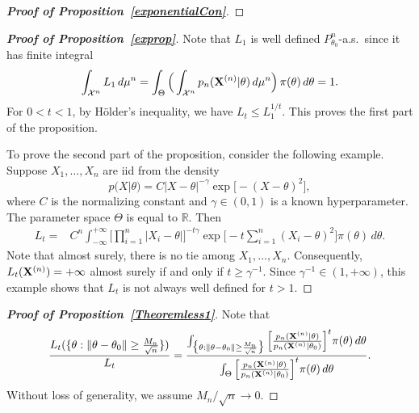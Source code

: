 \documentclass[11pt]{article}
\theoremstyle{plain}
\theoremstyle{definition}
\theoremstyle{remark}
\begin{document}
\begin{appendices}
\begin{proof}[\textbf{Proof of Proposition~\ref{exponentialCon}}]
\end{proof}

\begin{proof}[\textbf{Proof of Proposition~\ref{exprop}}]

Note that $L_1$ is well defined $P_{\theta_0}^n$-a.s.\ since it has finite integral
$$
\int_{\mathcal{X}^n} L_1 \, d\mu^n=
\int_{\Theta}\Big(\int_{\mathcal{X}^n} p_n(\mathbf{X}^{(n)}|\theta) \, d\mu^n \Big) \, \pi(\theta)\, d\theta=1.
$$
For $0<t<1$, by H\"older's inequality, we have $L_{t}\leq L_1^{1/t}$. This proves the first part of the proposition. 

To prove the second part of the proposition, consider the following example.
Suppose $X_1,\ldots,X_n$ are iid from the density
$$
    p(X|\theta)=C |X-\theta|^{-\gamma}\exp\big[-(X-\theta)^2\big]
,
$$
where $C$ is the normalizing constant and $\gamma\in(0,1)$ is a known hyperparameter. The parameter space $\Theta$ is equal to $\mathbb{R}$.
Then
$$
    \begin{aligned}
        L_t=&
    C^n \int_{-\infty}^{+\infty}
\Big[\prod_{i=1}^n |X_i-\theta|\Big]^{-t\gamma}
    \exp \big[-t\sum_{i=1}^n (X_i-\theta)^2 \big]
        \pi(\theta)
    \,
    d \theta.
    \end{aligned}
$$
Note that almost surely, there is no tie among $X_1,\ldots,X_n$. Consequently, $L_t(\mathbf{X}^{(n)})=+\infty$ almost surely if and only if $t\geq \gamma^{-1}$.
Since $\gamma^{-1}\in (1,+\infty)$, this example shows that $L_t$ is not always well defined for $t>1$.

\end{proof}



\begin{proof}[\textbf{Proof of Proposition~\ref{Theoremless1}}]
    Note that
       \begin{equation}\label{eq:numden}
       \frac{L_{t} (\{\theta: \|\theta-\theta_0\|\geq \frac{M_n}{\sqrt{n}}\})}
           {L_{t}}
=
    \frac{
        \int_{\big\{\theta: \|\theta-\theta_0\|\geq \frac{M_n}{\sqrt{n}}\big\}} \Big[ \frac{p_n(\mathbf{X}^{(n)}|\theta)}{p_n(\mathbf{X}^{(n)}|\theta_0)} \Big]^{t} \pi(\theta) \, d \theta
    }{
        \int_{\Theta} \Big[ \frac{p_n(\mathbf{X}^{(n)}|\theta)}{p_n(\mathbf{X}^{(n)}|\theta_0)} \Big]^{t} \pi(\theta) \, d \theta
    }.
       \end{equation}
    Without loss of generality, we assume ${M_n}/{\sqrt{n}}\to 0$.


\end{proof}
\end{appendices}
\end{document}
